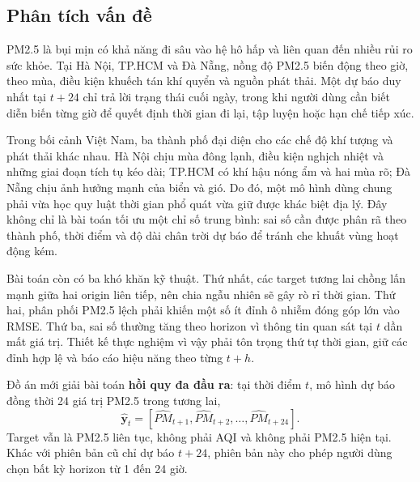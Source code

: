 \documentclass[11pt,a4paper]{article}
\begin{document}
\subsection{Phân tích vấn đề}
PM2.5 là bụi mịn có khả năng đi sâu vào hệ hô hấp và liên quan đến nhiều rủi ro sức khỏe. Tại Hà Nội, TP.HCM và Đà Nẵng, nồng độ PM2.5 biến động theo giờ, theo mùa, điều kiện khuếch tán khí quyển và nguồn phát thải. Một dự báo duy nhất tại $t+24$ chỉ trả lời trạng thái cuối ngày, trong khi người dùng cần biết diễn biến từng giờ để quyết định thời gian đi lại, tập luyện hoặc hạn chế tiếp xúc.

Trong bối cảnh Việt Nam, ba thành phố đại diện cho các chế độ khí tượng và phát thải khác nhau. Hà Nội chịu mùa đông lạnh, điều kiện nghịch nhiệt và những giai đoạn tích tụ kéo dài; TP.HCM có khí hậu nóng ẩm và hai mùa rõ; Đà Nẵng chịu ảnh hưởng mạnh của biển và gió. Do đó, một mô hình dùng chung phải vừa học quy luật thời gian phổ quát vừa giữ được khác biệt địa lý. Đây không chỉ là bài toán tối ưu một chỉ số trung bình: sai số cần được phân rã theo thành phố, thời điểm và độ dài chân trời dự báo để tránh che khuất vùng hoạt động kém.

Bài toán còn có ba khó khăn kỹ thuật. Thứ nhất, các target tương lai chồng lấn mạnh giữa hai origin liên tiếp, nên chia ngẫu nhiên sẽ gây rò rỉ thời gian. Thứ hai, phân phối PM2.5 lệch phải khiến một số ít đỉnh ô nhiễm đóng góp lớn vào RMSE. Thứ ba, sai số thường tăng theo horizon vì thông tin quan sát tại $t$ dần mất giá trị. Thiết kế thực nghiệm vì vậy phải tôn trọng thứ tự thời gian, giữ các đỉnh hợp lệ và báo cáo hiệu năng theo từng $t+h$.

Đồ án mới giải bài toán \textbf{hồi quy đa đầu ra}: tại thời điểm $t$, mô hình dự báo đồng thời 24 giá trị PM2.5 trong tương lai,
\begin{equation}
\hat{\mathbf y}_t=[\widehat{PM}_{t+1},\widehat{PM}_{t+2},\ldots,\widehat{PM}_{t+24}].
\end{equation}
Target vẫn là PM2.5 liên tục, không phải AQI và không phải PM2.5 hiện tại. Khác với phiên bản cũ chỉ dự báo $t+24$, phiên bản này cho phép người dùng chọn bất kỳ horizon từ 1 đến 24 giờ.
\end{document}
